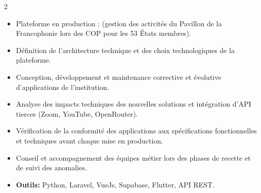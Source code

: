 \documentclass[10pt,a4paper,ragged2e,withhyper]{altacv}
\begin{document}
\begin{paracol}{2}
            \begin{itemize}
                \item Plateforme en production :  (gestion des activités du Pavillon de la Francophonie lors des COP pour les 53 États membres).
                \item Définition de l'architecture technique et des choix technologiques de la plateforme.
                \item Conception, développement et maintenance corrective et évolutive d'applications de l'institution.
                \item Analyse des impacts techniques des nouvelles solutions et intégration d'API tierces (Zoom, YouTube, OpenRouter).
                \item Vérification de la conformité des applications aux spécifications fonctionnelles et techniques avant chaque mise en production.
                \item Conseil et accompagnement des équipes métier lors des phases de recette et de suivi des anomalies.
                \item \textcolor{SecondaryColor}{\textbf{Outils: }} Python, Laravel, VueJs, Supabase, Flutter, API REST.
            \end{itemize}
            \divider


\end{paracol}
\end{document}
